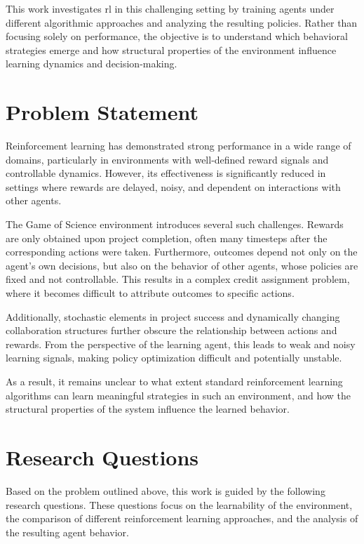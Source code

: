 \documentclass[english,bachelor]{hsluthesis}
\begin{document}
This work investigates \gls{rl} in this challenging setting by training agents under different algorithmic approaches and analyzing the resulting policies. Rather than focusing solely on performance, the objective is to understand which behavioral strategies emerge and how structural properties of the environment influence learning dynamics and decision-making.

\section{Problem Statement}
Reinforcement learning has demonstrated strong performance in a wide range of domains, particularly in environments with well-defined reward signals and controllable dynamics. However, its effectiveness is significantly reduced in settings where rewards are delayed, noisy, and dependent on interactions with other agents.

The Game of Science environment introduces several such challenges. Rewards are only obtained upon project completion, often many timesteps after the corresponding actions were taken. Furthermore, outcomes depend not only on the agent’s own decisions, but also on the behavior of other agents, whose policies are fixed and not controllable. This results in a complex credit assignment problem, where it becomes difficult to attribute outcomes to specific actions.

Additionally, stochastic elements in project success and dynamically changing collaboration structures further obscure the relationship between actions and rewards. From the perspective of the learning agent, this leads to weak and noisy learning signals, making policy optimization difficult and potentially unstable.

As a result, it remains unclear to what extent standard reinforcement learning algorithms can learn meaningful strategies in such an environment, and how the structural properties of the system influence the learned behavior.

\section{Research Questions}
Based on the problem outlined above, this work is guided by the following research questions. These questions focus on the learnability of the environment, the comparison of different reinforcement learning approaches, and the analysis of the resulting agent behavior.
\end{document}
